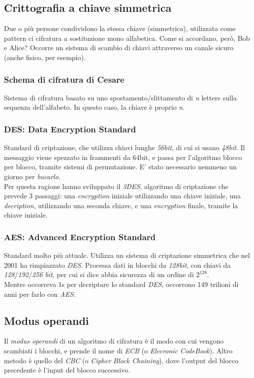 \subsection{Crittografia a chiave simmetrica}
Due o più persone condividono la stessa chiave (simmetrica), utilizzata come pattern ci cifratura a sostituzione mono alfabetica. Come si accordano, però, Bob e Alice? Occorre un sistema di scambio di chiavi attraverso un canale sicuro (anche fisico, per esempio).
\subsubsection{Schema di cifratura di Cesare}
Sistema di cifratura basato su uno spostamento/slittamento di \textit{n} lettere sulla sequenza dell'alfabeto. In questo caso, la chiave è proprio \textit{n}.

\subsubsection{DES: Data Encryption Standard}
Standard di criptazione, che utilizza chiavi lunghe \textit{56bit}, di cui si usano \textit{48bit}. Il messaggio viene spezzato in frammenti da 64bit, e passa per l'algoritmo blocco per blocco, tramite sistemi di permutazione. E' stato necessario nemmeno un giorno per \textit{bucarlo}. \\
Per questa ragione hanno sviluppato il \textit{3DES}, algoritmo di criptazione che prevede 3 passaggi: una \textit{encryption} iniziale utilizzando una chiave iniziale, una \textit{decription}, utilizzando una seconda chiave, e una \textit{encryption} finale, tramite la chiave iniziale.

\subsubsection{AES: Advanced Encryption Standard}
Standard molto più attuale. Utilizza un sistema di criptazione simmetrica che nel 2001 ha rimpiazzato \textit{DES}. Processa dati in blocchi da \textit{128bit}, con chiavi da \textit{128}/\textit{192}/\textit{256 bit}, per cui si dice abbia sicurezza di un ordine di $2^{128}$. \\
Mentre occorreva 1s per decriptare lo standard \textit{DES}, occorrono 149 trilioni di anni per farlo con \textit{AES}.
\newpage

\subsection{Modus operandi}
Il \textit{modus operandi} di un algoritmo di cifratura è il modo con cui vengono scambiati i blocchi, e prende il nome di \textit{ECB} (o \textit{Elecronic CodeBook}).
Altro metodo è quello del \textit{CBC} (o \textit{Cipher Block Chaining}), dove l'output del blocco precedente è l'input del blocco successivo.

